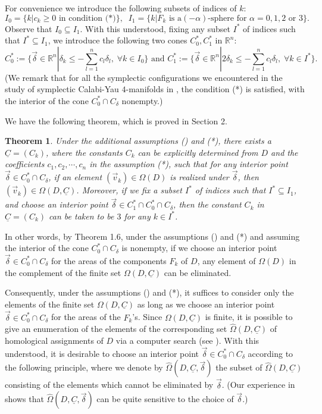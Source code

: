 \documentclass[11pt]{amsart}
\theoremstyle{plain}
\newtheorem{theorem}{Theorem}
\numberwithin{theorem}{section}
\theoremstyle{definition}
\newcommand{\R}{{\mathbb R}}
\begin{document}
For convenience we introduce the following subsets of indices of $k$:
$$
I_0=\{k|c_k\geq 0 \mbox{ in condition (*)}\}, \;\; I_1=\{k|\mbox{$F_k$ is a
$(-\alpha)$-sphere for $\alpha=0,1,2$ or $3$}\}.
$$
Observe that $I_0\subseteq I_1$. With this understood, fixing any subset $I^\ast$ of indices such that
$I^\ast\subseteq I_1$, we introduce the following two cones $C^\ast_0, C^\ast_1$ in $\R^n$:
$$
C^\ast_0:=\{\vec{\delta}\in \R^n| \delta_k \leq -\sum_{l=1}^n c_l\delta_l, \; \forall k\in I_0\} 
\mbox{ and }
C^\ast_1:=\{\vec{\delta}\in \R^n| 2 \delta_k \leq -\sum_{l=1}^n c_l\delta_l, \; \forall k\in I^\ast\}.
$$
(We remark that for all the symplectic configurations we encountered in the study of symplectic Calabi-Yau 
$4$-manifolds in \cite{C,C1}, the condition (*) is satisfied, with the interior of the cone 
$C^\ast_0 \cap C_\delta$ nonempty.)

We have the following theorem, which is proved in Section 2.

\begin{theorem}
Under the additional assumptions (\ddag) and (*), there exists a $\underline{C}=(C_k)$, where the constants 
$C_k$ can be explicitly determined from $D$ and the coefficients $c_1,c_2,\cdots,c_n$ in the assumption (*), such that for any interior point $\vec{\delta}\in C^\ast_0 \cap C_\delta$, if an element 
$(\vec{v}_k)\in \Omega(D)$ is realized under $\vec{\delta}$, then $(\vec{v}_k)\in \Omega(D,\underline{C})$.
Moreover, if we fix a subset $I^\ast$ of indices such that $I^\ast\subseteq I_1$, and choose an interior point 
$\vec{\delta}\in C^\ast_1 \cap C^\ast_0\cap C_\delta$, then the constant $C_k$ in $\underline{C}=(C_k)$ can be taken to be $3$ for any $k\in I^\ast$.
\end{theorem}

In other words, by Theorem 1.6, under the assumptions (\ddag) and (*) and assuming the interior of the cone 
$C^\ast_0 \cap C_\delta$ is nonempty, if we choose an interior point $\vec{\delta}\in C^\ast_0 \cap C_\delta$ for the areas of the components $F_k$ of $D$, any element of $\Omega(D)$ in the complement of the finite set 
$\Omega(D,\underline{C})$ can be eliminated. 

Consequently, under the assumptions (\ddag) and (*), it suffices to consider only the elements of the finite set 
$\Omega(D,\underline{C})$ as long as we choose an interior point $\vec{\delta}\in C^\ast_0 \cap C_\delta$ for the areas of the $F_k$'s. Since $\Omega(D,\underline{C})$ is finite, it is possible to give an enumeration of the elements of the corresponding set $\hat{\Omega}(D,\underline{C})$ of homological assignments of $D$ via a computer search (see \cite{CGM}). With this understood, it is desirable to choose an interior point 
$\vec{\delta}\in C^\ast_0 \cap C_\delta$ according to the following principle, where we denote by 
$\hat{\Omega}(D,\underline{C},\vec{\delta})$ the subset of $\hat{\Omega}(D,\underline{C})$ consisting of the elements which cannot be eliminated by  $\vec{\delta}$.
(Our experience in \cite{C} shows that $\hat{\Omega}(D,\underline{C},\vec{\delta})$ can be quite sensitive to
the choice of $\vec{\delta}$.)
\end{document}
